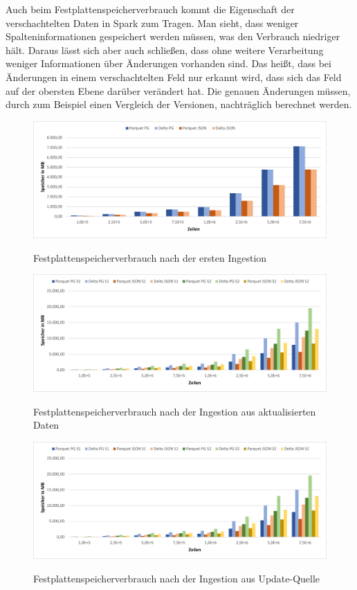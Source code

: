 Auch beim Festplattenspeicherverbrauch kommt die Eigenschaft der verschachtelten Daten in Spark zum Tragen.
Man sieht, dass weniger Spalteninformationen gespeichert werden müssen, was den Verbrauch niedriger hält.
Daraus lässt sich aber auch schließen, dass ohne weitere Verarbeitung weniger Informationen über Änderungen vorhanden sind.
Das heißt, dass bei Änderungen in einem verschachtelten Feld nur erkannt wird, dass sich das Feld auf der obersten Ebene darüber verändert hat.
Die genauen Änderungen müssen, durch zum Beispiel einen Vergleich der Versionen, nachträglich berechnet werden.


\begin{figure}
    \centering
    \caption{Festplattenspeicherverbrauch nach der ersten Ingestion}
    \includegraphics[width=\textwidth]{Grafiken/Evaluierung/Speicher-Initial}
    \label{fig:eval-storage-i}
\end{figure}

\begin{figure}
    \centering
    \caption{Festplattenspeicherverbrauch nach der Ingestion aus aktualisierten Daten}
    \includegraphics[width=\textwidth]{Grafiken/Evaluierung/Speicher-Update}
    \label{fig:eval-storage-u}
\end{figure}

\begin{figure}
    \centering
    \caption{Festplattenspeicherverbrauch nach der Ingestion aus Update-Quelle}
    \includegraphics[width=\textwidth]{Grafiken/Evaluierung/Speicher-Cdc}
    \label{fig:eval-storage-c}
\end{figure}